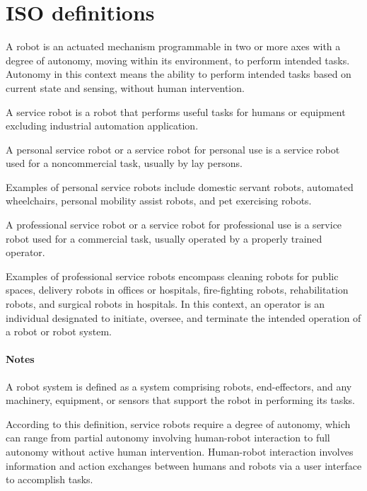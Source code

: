 \section{ISO definitions}
\begin{definition}
    A robot is an actuated mechanism programmable in two or more axes with a degree of autonomy, moving within its environment, to perform intended tasks. 
    Autonomy in this context means the ability to perform intended tasks based on current state and sensing, without human intervention.
\end{definition}

\begin{definition}
    A service robot is a robot that performs useful tasks for humans or equipment excluding industrial automation application. 
\end{definition}
\begin{definition}
    A personal service robot or a service robot for personal use is a service robot used for a noncommercial task, usually by lay persons. 
\end{definition}
Examples of personal service robots include domestic servant robots, automated wheelchairs, personal mobility assist robots, and pet exercising robots.
\begin{definition}
    A professional service robot or a service robot for professional use is a service robot used for a commercial task, usually operated by a properly trained operator.
\end{definition}
Examples of professional service robots encompass cleaning robots for public spaces, delivery robots in offices or hospitals, fire-fighting robots, rehabilitation robots, and surgical robots in hospitals.
In this context, an operator is an individual designated to initiate, oversee, and terminate the intended operation of a robot or robot system.

\paragraph*{Notes}
A robot system is defined as a system comprising robots, end-effectors, and any machinery, equipment, or sensors that support the robot in performing its tasks.

According to this definition, service robots require a degree of autonomy, which can range from partial autonomy involving human-robot interaction to full autonomy without active human intervention. 
Human-robot interaction involves information and action exchanges between humans and robots via a user interface to accomplish tasks.

